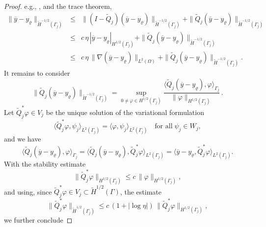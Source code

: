 \documentclass{article}
\numberwithin{equation}{section}
\begin{document}
\begin{proof}
  e.g., \cite{Steinbach:2001NumerMath,Steinbach:2002NumerMath}, and the
  trace theorem,
  \begin{eqnarray*}
    \| \overline{y} - y_\varrho \|_{\widetilde{H}^{-1/2}(\Gamma_j)}
    & \leq & \| (I-\widetilde{Q}_j)(\overline{y} - y_\varrho)
             \|_{\widetilde{H}^{-1/2}(\Gamma_j)}
             +
             \| \widetilde{Q}_j (\overline{y} - y_\varrho)
             \|_{\widetilde{H}^{-1/2}(\Gamma_j)} \\
    & \leq & c \, \eta \, | \overline{y} - y_\varrho |_{H^{1/2}(\Gamma_j)}
             +
             \| \widetilde{Q}_j (\overline{y} - y_\varrho)
             \|_{\widetilde{H}^{-1/2}(\Gamma_j)} \\
    & \leq & c \, \eta \, \| \nabla (\overline{y} - y_\varrho) \|_{L^2(\Omega)}
             +
             \| \widetilde{Q}_j (\overline{y} - y_\varrho)
             \|_{\widetilde{H}^{-1/2}(\Gamma_j)} .
  \end{eqnarray*}
  It remains to consider
  \[
    \| \widetilde{Q}_j (\overline{y} - y_\varrho)
    \|_{\widetilde{H}^{-1/2}(\Gamma_j)} =
    \sup\limits_{0 \neq \varphi \in H^{1/2}(\Gamma_j)}
    \frac{\langle \widetilde{Q}_j (\overline{y} - y_\varrho),
      \varphi \rangle_{\Gamma_j}}{\| \varphi \|_{H^{1/2}(\Gamma_j)}} \, .
  \]
  Let $\widetilde{Q}_j^* \varphi \in V_j$ be the unique solution
  of the variational formulation
  \[
    \langle \widetilde{Q}_j^* \varphi , \psi_j \rangle_{L^2(\Gamma_j)} =
    \langle \varphi , \psi_j \rangle_{L^2(\Gamma_j)} \quad
    \mbox{for all} \; \psi_j \in W_j,
  \]
  and we have
  \[
    \langle \widetilde{Q}_j (\overline{y} - y_\varrho),
    \varphi \rangle_{\Gamma_j} =
    \langle \widetilde{Q}_j (\overline{y}-y_\varrho) ,
    \widetilde{Q}_j^* \varphi \rangle_{L^2(\Gamma_j)} =
    \langle \overline{y}-y_\varrho ,
    \widetilde{Q}_j^* \varphi \rangle_{L^2(\Gamma_j)} .
  \]
  With the stability estimate
  \cite{Steinbach:2001NumerMath,Steinbach:2002NumerMath}
  \[
    \| \widetilde{Q}_j^* \varphi \|_{H^{1/2}(\Gamma_j)} \leq c \,
    \| \varphi \|_{H^{1/2}(\Gamma_j)} ,
  \]
  and using, since $\widetilde{Q}_j^* \varphi \in V_j \subset
  \widetilde{H}^{1/2}(\Gamma)$, the estimate
  \cite[Theorem 4.1]{McLeanSteinbach:1999AdvComputMath}
  \begin{equation}\label{Eqn:Einettung Htilde}
    \| \widetilde{Q}_j^* \varphi \|_{\widetilde{H}^{1/2}(\Gamma_j)}
    \leq c \, (1 + |\log \eta|) \,
    \| \widetilde{Q}_j^* \varphi \|_{H^{1/2}(\Gamma_j)} ,
  \end{equation}
  we further conclude

\end{proof}
\end{document}
